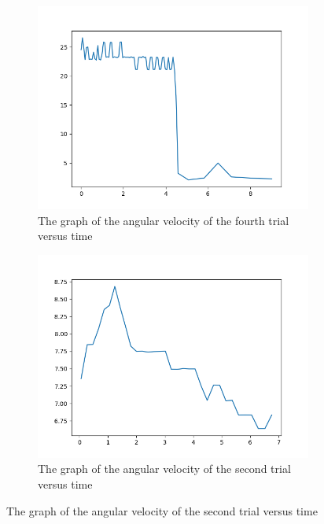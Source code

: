 \documentclass[a4paper]{article}
\begin{document}
\begin{figure}[ht]
  \centering
  \begin{subfigure}{.45\textwidth}
    \centering
    \includegraphics[width=\textwidth]{img/v-theta-4}
    \caption{The graph of the angular velocity of the fourth trial versus time}
    \label{fig:v-theta-4}
  \end{subfigure}
  \begin{subfigure}{.45\textwidth}
    \centering
    \includegraphics[width=\textwidth]{img/v-theta-2}
    \caption{The graph of the angular velocity of the second trial versus time}
    \label{fig:v-theta-2}
  \end{subfigure}
\end{figure}
\end{document}
